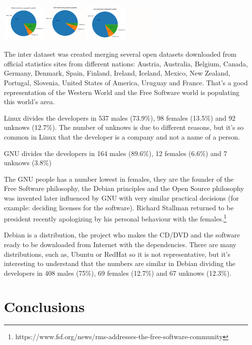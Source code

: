 \documentclass[a4paper]{article}
\begin{document}
\includegraphics[width=0.6\textwidth]{images/debian-gnu-linux.pdf}   
   
The inter dataset was created merging several open datasets downloaded
from official statistics sites from different nations: Austria,
Australia, Belgium, Canada, Germany, Denmark, Spain, Finland, Ireland,
Iceland, Mexico, New Zealand, Portugal, Slovenia, United States of
America, Uruguay and France. That's a good representation of the
Western World and the Free Software world is populating this world's
area\cite{gonzalez2008geographic}.



Linux divides the developers in 537 males (73.9\%), 98 females
(13.5\%) and 92 unknows (12.7\%). The number of unknows is due to
different reasons, but it's so common in Linux that the developer is a
company and not a name of a person.

GNU divides the developers in 164 males (89.6\%), 12 females (6.6\%)
and 7 unknows (3.8\%)

The GNU people has a number lowest in females, they are the founder of
the Free Software philosophy, the Debian principles and the Open
Source philosophy was invented later influenced by GNU with very
similar practical decisions (for example: deciding licenses for the
software). Richard Stallman returned to be president recently
apologizing by his personal behaviour with the
females.\footnote{https://www.fsf.org/news/rms-addresses-the-free-software-community}

Debian is a distribution, the project who makes the CD/DVD and the
software ready to be downloaded from Internet with the
dependencies. There are many distributions, such as, Ubuntu or RedHat
so it is not representative, but it's interesting to understand that
the numbers are similar in Debian dividing the developers in 408 males
(75\%), 69 females (12.7\%) and 67 unknows (12.3\%).


\section{Conclusions}
\label{sec:conclusions}
\end{document}
